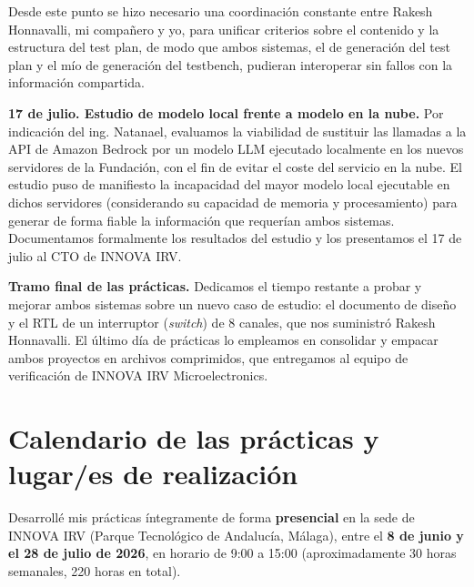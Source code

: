 Desde este punto se hizo necesario una coordinación constante entre Rakesh Honnavalli, mi compañero y yo, para unificar criterios sobre el contenido y la estructura del test plan, de modo que ambos sistemas, el de generación del test plan y el mío de generación del testbench, pudieran interoperar sin fallos con la información compartida.

\textbf{17 de julio. Estudio de modelo local frente a modelo en la nube.} Por indicación del ing. Natanael, evaluamos la viabilidad de sustituir las llamadas a la API de Amazon Bedrock por un modelo LLM ejecutado localmente en los nuevos servidores de la Fundación, con el fin de evitar el coste del servicio en la nube. El estudio puso de manifiesto la incapacidad del mayor modelo local ejecutable en dichos servidores (considerando su capacidad de memoria y procesamiento) para generar de forma fiable la información que requerían ambos sistemas. Documentamos formalmente los resultados del estudio y los presentamos el 17 de julio al CTO de INNOVA IRV.

\textbf{Tramo final de las prácticas.} Dedicamos el tiempo restante a probar y mejorar ambos sistemas sobre un nuevo caso de estudio: el documento de diseño y el RTL de un interruptor (\emph{switch}) de 8 canales, que nos suministró Rakesh Honnavalli. El último día de prácticas lo empleamos en consolidar y empacar ambos proyectos en archivos comprimidos, que entregamos al equipo de verificación de INNOVA IRV Microelectronics.

\section{Calendario de las prácticas y lugar/es de realización}

Desarrollé mis prácticas íntegramente de forma \textbf{presencial} en la sede de INNOVA IRV (Parque Tecnológico de Andalucía, Málaga), entre el \textbf{8 de junio y el 28 de julio de 2026}, en horario de 9:00 a 15:00 (aproximadamente 30 horas semanales, 220 horas en total).

